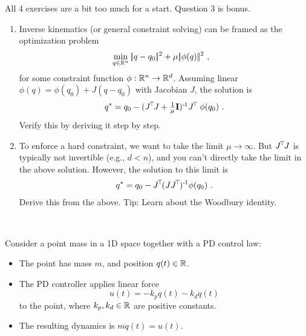 

\renewcommand{\course}{Robot Learning}
\renewcommand{\coursepicture}{roblearn.png}
\renewcommand{\coursedate}{Summer 2024}
\renewcommand{\exnum}{Weekly Exercise 1}

\exercises


\exercisestitle

All 4 exercises are a bit too much for a start. Question 3 is bonus.



\begin{enumerate}
\item Inverse kinematics (or general constraint solving) can be framed as the optimization problem
\begin{align}
&\min_{q\in{\mathbb{R}}^n} |\!|q-q_0|\!|^2 + \mu |\!|\phi(q)|\!|^2 ~,
\end{align}
for some constraint function $\phi: {\mathbb{R}}^n \to {\mathbb{R}}^d$. Assuming linear $\phi(q) = \phi(q_0) + J (q-q_0)$ with Jacobian $J$, the solution is
\begin{align}
q^* = q_0 - (J^{\!\top\!} J + \textstyle\frac{1}{\mu} {\rm\bf I})^{{\hspace*{-.0pt}\text{\rm -}\hspace*{-.5pt}}1} J^{\!\top\!}~ \phi(q_0) ~.
\end{align}
Verify this by deriving it step by step.

\item To enforce a hard constraint, we want to take the limit $\mu\to\infty$. But $J^{\!\top\!} J$ is typically not invertible (e.g., $d<n$), and you can't directly take the limit in the above solution. However, the solution to this limit is
\begin{align}
q^* = q_0 - J^{\!\top\!} (J J^{\!\top\!})^{{\hspace*{-.0pt}\text{\rm -}\hspace*{-.5pt}}1} \phi(q_0) ~.
\end{align}
Derive this from the above. Tip: Learn about the Woodbury identity.


\end{enumerate}



~


Consider a point mass in a 1D space together with a PD control law:
\begin{itemize}
\item The point has mass $m$, and position $q(t) \in {\mathbb{R}}$.
\item The PD controller applies linear force 
$$u(t) = - k_p q(t) - k_d \dot q(t)$$
to the point, where $k_p, k_d \in {\mathbb{R}}$ are positive constants.
\item The resulting dynamics is $m \ddot q(t) = u(t)$.
\end{itemize}

